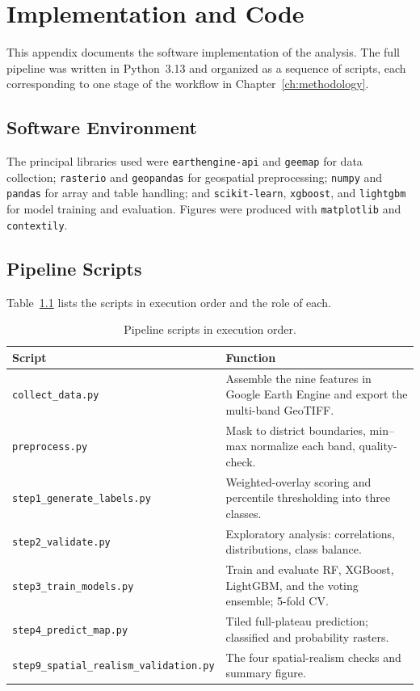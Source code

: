\chapter{Implementation and Code}
\label{app:code}

This appendix documents the software implementation of the analysis. The full
pipeline was written in Python~3.13 and organized as a sequence of scripts, each
corresponding to one stage of the workflow in Chapter~\ref{ch:methodology}.

\section{Software Environment}
\label{app:env}

The principal libraries used were \texttt{earthengine-api} and \texttt{geemap}
for data collection; \texttt{rasterio} and \texttt{geopandas} for geospatial
preprocessing; \texttt{numpy} and \texttt{pandas} for array and table handling;
and \texttt{scikit-learn}, \texttt{xgboost}, and \texttt{lightgbm} for model
training and evaluation. Figures were produced with \texttt{matplotlib} and
\texttt{contextily}.

\section{Pipeline Scripts}
\label{app:scripts}

Table~\ref{tab:scripts} lists the scripts in execution order and the role of each.

\begin{table}[H]
\centering
\caption{Pipeline scripts in execution order.}
\label{tab:scripts}
\small
\begin{tabular}{p{4.4cm} p{8.6cm}}
\toprule
Script & Function \\
\midrule
\texttt{collect\_data.py}        & Assemble the nine features in Google Earth Engine and export the multi-band GeoTIFF. \\
\texttt{preprocess.py}           & Mask to district boundaries, min--max normalize each band, quality-check. \\
\texttt{step1\_generate\_labels.py} & Weighted-overlay scoring and percentile thresholding into three classes. \\
\texttt{step2\_validate.py}      & Exploratory analysis: correlations, distributions, class balance. \\
\texttt{step3\_train\_models.py} & Train and evaluate RF, XGBoost, LightGBM, and the voting ensemble; 5-fold CV. \\
\texttt{step4\_predict\_map.py}  & Tiled full-plateau prediction; classified and probability rasters. \\
\texttt{step9\_spatial\_realism\_validation.py} & The four spatial-realism checks and summary figure. \\
\bottomrule
\end{tabular}
\end{table}

